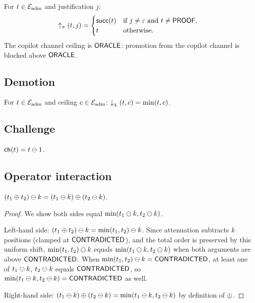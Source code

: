 \documentclass[11pt]{article}
\begin{document}
\begin{definition}[Promotion]\label{def:promote}
For $t \in \mathcal{E}_{\mathrm{adm}}$ and justification $j$:
\[
  \uparrow_\pi(t, j) =
  \begin{cases}
    \mathsf{succ}(t) & \text{if } j \neq \varepsilon
                        \text{ and } t \neq \mathsf{PROOF}, \\
    t                 & \text{otherwise}.
  \end{cases}
\]
The copilot channel ceiling is $\mathsf{ORACLE}$: promotion
from the copilot channel is blocked above $\mathsf{ORACLE}$.
\end{definition}

\subsection{Demotion}\label{sec:demote}

\begin{definition}\label{def:demote}
For $t \in \mathcal{E}_{\mathrm{adm}}$ and ceiling $c \in \mathcal{E}_{\mathrm{adm}}$:
$\downarrow_\chi(t, c) = \min(t, c)$.
\end{definition}

\subsection{Challenge}\label{sec:challenge}

\begin{definition}[Challenge]\label{def:challenge}
$\mathsf{ch}(t) = t \ominus 1$.
\end{definition}

\subsection{Operator interaction}\label{sec:interaction}

\begin{proposition}
\label{prop:distribute}
$(t_1 \oplus t_2) \ominus k = (t_1 \ominus k) \oplus (t_2 \ominus k)$.
\end{proposition}

\begin{proof}
We show both sides equal $\min(t_1 \ominus k, t_2 \ominus k)$.

Left-hand side:
$(t_1 \oplus t_2) \ominus k = \min(t_1, t_2) \ominus k$.
Since attenuation subtracts $k$ positions (clamped at $\mathsf{CONTRADICTED}$),
and the total order is preserved by this uniform shift,
$\min(t_1, t_2) \ominus k$ equals
$\min(t_1 \ominus k, t_2 \ominus k)$
when both arguments are above $\mathsf{CONTRADICTED}$.
When $\min(t_1, t_2) \ominus k = \mathsf{CONTRADICTED}$, at least one
of $t_1 \ominus k$, $t_2 \ominus k$ equals $\mathsf{CONTRADICTED}$, so
$\min(t_1 \ominus k, t_2 \ominus k) = \mathsf{CONTRADICTED}$ as well.

Right-hand side:
$(t_1 \ominus k) \oplus (t_2 \ominus k)
= \min(t_1 \ominus k, t_2 \ominus k)$
by definition of $\oplus$.
\end{proof}
\end{document}
